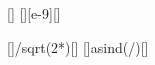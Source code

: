 [\V]
[\nano\m][e-9][\m]

[]{\nchX/sqrt(2*\ncmeX*\nceX*\UX)}[\m]
[\arcsin{}]{asind(\laX/\dX)}[\degree]

